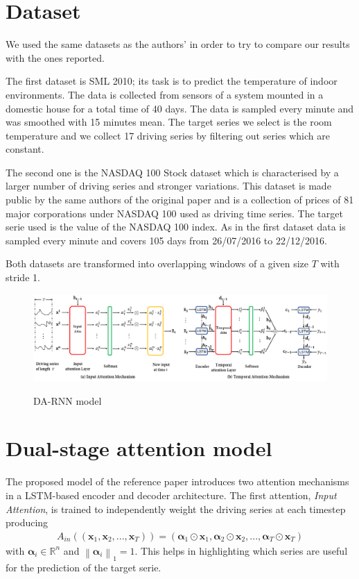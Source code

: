 \documentclass{article}
\newcommand{\norm}[1]{\left\lVert#1\right\rVert}
\begin{document}
\section{Dataset}
\label{sec:retrieval}

We used the same datasets as the authors' in order to try to compare our results
with the ones reported.

The first dataset is SML 2010; its task is to predict the temperature of indoor 
environments. The data is collected from sensors of a system mounted in a 
domestic house for a total time of 40 days. The data is sampled every minute and 
was smoothed with 15 minutes mean. The target series we select is the room 
temperature and we collect 17 driving series by filtering out series which
are constant.

The second one is the NASDAQ 100 Stock dataset which is characterised by a
larger number of driving series and stronger variations. This dataset is
made public by the same
authors of the original paper and is a collection of prices of 81 major
corporations under NASDAQ 100 used as driving time series. The target serie
used is the value of the NASDAQ 100 index. As in the first dataset data is
sampled every minute and covers 105 days from 26/07/2016 to 22/12/2016.

Both datasets are transformed into overlapping windows of a given size
$T$ with stride 1.

\begin{figure}[h]
\centering
\includegraphics[width=\linewidth]{da-rnn.png} \\
\caption{DA-RNN model}

\label{fig:da-rnn}
\end{figure}


\section{Dual-stage attention model}
\label{sec:da-rnn}

The proposed model of the reference paper introduces two attention
mechanisms in a LSTM-based encoder and decoder architecture. The first
attention, \textit{Input Attention}, is trained to independently weight
the driving series at each timestep producing
\begin{align*}
A_{in}((\mathbf{x}_1, \mathbf{x}_2, ..., \mathbf{x}_T)) =
(\boldsymbol{\alpha}_1 \odot \mathbf{x}_1, \boldsymbol{\alpha}_2 \odot \mathbf{x}_2, ..., \boldsymbol{\alpha}_T \odot \mathbf{x}_T)
\end{align*}
with $\boldsymbol{\alpha}_i \in \mathbb{R}^n$ and $\norm{\boldsymbol{\alpha}_i}_1 = 1$.
This helps in highlighting which series are useful for the prediction of
the target serie.
\end{document}
